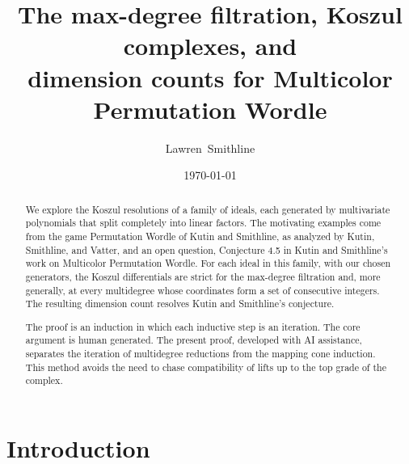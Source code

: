 \documentclass[12pt]{amsart}
\theoremstyle{definition}
\theoremstyle{remark}
\newcommand\classic{Permutation Wordle\xspace}
\newcommand\rainbow{Multicolor Permutation Wordle\xspace}
\begin{document}
\title[Max-degree filtration and Multicolor Permutation Wordle]
{The max-degree filtration, Koszul complexes, and \\
 dimension counts for Multicolor Permutation Wordle}

\date{\today}



\author[Lawren Smithline]{Lawren~Smithline}
\address{Center for Communications Research, 805 Bunn Drive, Princeton,
NJ 08540-1966, USA}


\begin{abstract}
    We explore the Koszul resolutions of a family of ideals, each generated by
  multivariate polynomials that split completely into linear factors.
    The motivating examples come from the game \classic of Kutin and Smithline,
  as analyzed by Kutin, Smithline, and Vatter, and an open question,
  Conjecture 4.5 in Kutin and Smithline's
  work on \rainbow.
  For each ideal in this family, with our chosen generators,
  the Koszul differentials are strict for the max-degree filtration and,
  more generally, at every multidegree whose coordinates form a set of
  consecutive integers.
  The resulting dimension count resolves Kutin and Smithline's conjecture.
  
  The proof is an induction in which each inductive step is an iteration. The core argument is human generated. The present proof, developed with AI assistance, separates the 
  iteration of multidegree reductions from the mapping cone induction. This method avoids the need to chase compatibility of lifts up to the top grade of the complex.
\end{abstract}




\maketitle

\section{Introduction}
\end{document}
